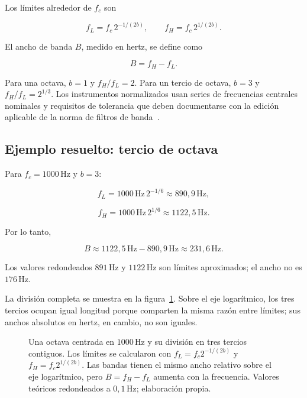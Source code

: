 Los límites alrededor de \(f_c\) son

\begin{equation}
    f_L=f_c\,2^{-1/(2b)},
    \qquad
    f_H=f_c\,2^{1/(2b)}.
    \label{eq:u5-limites-banda}
\end{equation}

El ancho de banda \(B\), medido en hertz, se define como

\begin{equation}
    B=f_H-f_L.
    \label{eq:u5-ancho-banda}
\end{equation}

Para una octava, \(b=1\) y \(f_H/f_L=2\). Para un tercio de octava,
\(b=3\) y \(f_H/f_L=2^{1/3}\). Los instrumentos normalizados usan
series de frecuencias centrales nominales y requisitos de tolerancia que deben
documentarse con la edición aplicable de la norma de filtros de banda~\cite{iec61260_1_2014}.

\subsection{Ejemplo resuelto: tercio de octava}
\label{sec:u5-ejemplo-tercio}

Para \(f_c=1000\,\text{Hz}\) y \(b=3\):

\[
    f_L=1000\,\text{Hz}\,2^{-1/6}
       \approx890{,}9\,\text{Hz},
\]

\[
    f_H=1000\,\text{Hz}\,2^{1/6}
       \approx1122{,}5\,\text{Hz}.
\]

Por lo tanto,

\[
    B\approx1122{,}5\,\text{Hz}-890{,}9\,\text{Hz}
      \approx231{,}6\,\text{Hz}.
\]

Los valores redondeados \(891\,\text{Hz}\) y \(1122\,\text{Hz}\) son límites
aproximados; el ancho no es \(176\,\text{Hz}\).

La división completa se muestra en la
figura~\ref{fig:u5-bandas-octava-tercio}. Sobre el eje logarítmico, los tres
tercios ocupan igual longitud porque comparten la misma razón entre límites;
sus anchos absolutos en hertz, en cambio, no son iguales.

\begin{figure}[htbp]
    \centering
    
    \caption{Una octava centrada en \(1000\,\text{Hz}\) y su división en tres
    tercios contiguos. Los límites se calcularon con
    \(f_L=f_c2^{-1/(2b)}\) y \(f_H=f_c2^{1/(2b)}\). Las bandas tienen el mismo
    ancho relativo sobre el eje logarítmico, pero \(B=f_H-f_L\) aumenta con la
    frecuencia. Valores teóricos redondeados a \(0{,}1\,\text{Hz}\);
    elaboración propia.}
    \label{fig:u5-bandas-octava-tercio}
\end{figure}

